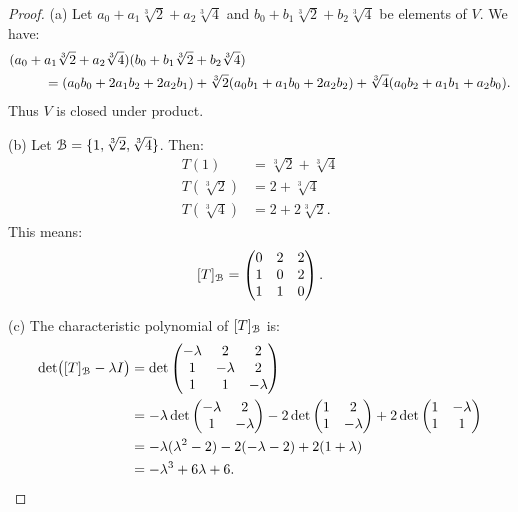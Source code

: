 \documentclass[10pt,twoside,openany]{memoir}
\begin{document}
    {\color{blue} \begin{proof}
    (a) Let $a_0 + a_1 \sqrt[3]{2} + a_2 \sqrt[3]{4}$ and $b_0 + b_1 \sqrt[3]{2} + b_2 \sqrt[3]{4}$ be elements of $V$. We have:
        \begin{equation*}
        \begin{aligned}
            &(a_0 + a_1 \sqrt[3]{2} + a_2 \sqrt[3]{4})(b_0 + b_1 \sqrt[3]{2} + b_2 \sqrt[3]{4}) \\
            &\hspace{2.6em}= (a_0b_0 + 2a_1b_2 + 2a_2b_1)
            + \sqrt[3]{2}(a_0b_1 + a_1b_0 + 2a_2b_2)
            + \sqrt[3]{4}(a_0b_2 + a_1b_1 + a_2b_0).
        \end{aligned}
        \end{equation*}
    Thus $V$ is closed under product.

    (b) Let $\mathcal{B} = \{1,\sqrt[3]{2},\sqrt[3]{4}\}$. Then:
        \begin{equation*}
        \begin{split}
            T(1) &= \sqrt[3]{2} + \sqrt[3]{4} \\
            T(\sqrt[3]{2}) &= 2 + \sqrt[3]{4} \\
            T(\sqrt[3]{4}) & = 2 + 2\sqrt[3]{2}.
        \end{split}
        \end{equation*}
    This means:
        \begin{equation*}
        \begin{split}
            [T]_{\mathcal{B}} = \left( \begin{matrix} 0 & 2 & 2 \\ 1 & 0 & 2 \\ 1 & 1 & 0 \end{matrix} \right).
        \end{split}
        \end{equation*}

    (c) The characteristic polynomial of $[T]_{\mathcal{B}}$ is:
        \begin{equation*}
        \begin{split}
            \det\bigl([T]_{\mathcal{B}} - \lambda I\bigr)
            & = \det \left( \begin{matrix} -\lambda & 2 & 2 \\ 1 & -\lambda & 2 \\ 1 & 1 & -\lambda \end{matrix} \right) \\
            & = -\lambda \det \left( \begin{matrix} -\lambda & 2\\ 1 & -\lambda \end{matrix} \right) - 2 \det \left( \begin{matrix} 1 & 2 \\ 1 & -\lambda \end{matrix} \right) + 2 \det \left( \begin{matrix} 1 & -\lambda \\ 1 & 1 \end{matrix} \right) \\
            & = -\lambda (\lambda^2 - 2) - 2(-\lambda -2) + 2(1 + \lambda) \\
            & = -\lambda^3 + 6\lambda +6. \qedhere
        \end{split}
        \end{equation*}
    \end{proof}}
\end{document}
